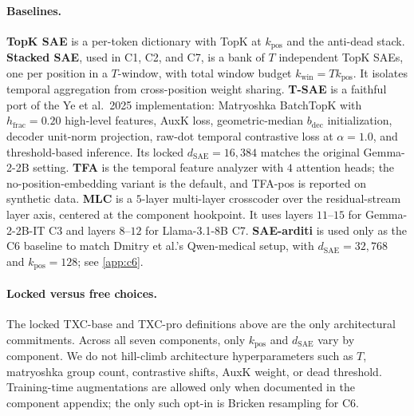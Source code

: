 \paragraph{Baselines.}
\textbf{TopK SAE} \citep{gao2024scaling} is a per-token dictionary with TopK at $k_{\mathrm{pos}}$ and the anti-dead stack. \textbf{Stacked SAE}, used in C1, C2, and C7, is a bank of $T$ independent TopK SAEs, one per position in a $T$-window, with total window budget $k_{\mathrm{win}}=T k_{\mathrm{pos}}$. It isolates temporal aggregation from cross-position weight sharing. \textbf{T-SAE} \citep{bhalla2025temporal} is a faithful port of the Ye et al.\ 2025 implementation: Matryoshka BatchTopK with $h_{\mathrm{frac}}=0.20$ high-level features, AuxK loss, geometric-median $b_{\mathrm{dec}}$ initialization, decoder unit-norm projection, raw-dot temporal contrastive loss at $\alpha=1.0$, and threshold-based inference. Its locked $d_{\mathrm{SAE}}=16{,}384$ matches the original Gemma-2-2B setting. \textbf{TFA} \citep{lubana2025priors} is the temporal feature analyzer with $4$ attention heads; the no-position-embedding variant is the default, and TFA-pos is reported on synthetic data. \textbf{MLC} \citep{lindsey2024sparsecrosscoders} is a $5$-layer multi-layer crosscoder over the residual-stream layer axis, centered at the component hookpoint. It uses layers $11$--$15$ for Gemma-2-2B-IT C3 and layers $8$--$12$ for Llama-3.1-8B C7. \textbf{SAE-arditi} is used only as the C6 baseline to match Dmitry et al.'s Qwen-medical setup, with $d_{\mathrm{SAE}}=32{,}768$ and $k_{\mathrm{pos}}=128$; see \cref{app:c6}.

\paragraph{Locked versus free choices.}
The locked TXC-base and TXC-pro definitions above are the only architectural commitments. Across all seven components, only $k_{\mathrm{pos}}$ and $d_{\mathrm{SAE}}$ vary by component. We do not hill-climb architecture hyperparameters such as $T$, matryoshka group count, contrastive shifts, AuxK weight, or dead threshold. Training-time augmentations are allowed only when documented in the component appendix; the only such opt-in is Bricken resampling for C6.



